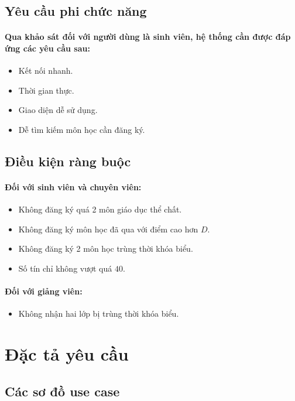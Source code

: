 \documentclass{article}
\begin{document}
  \subsection{Yêu cầu phi chức năng}
    \paragraph{
      \textnormal{
        Qua khảo sát đối với người dùng là sinh viên, hệ thống cần được đáp ứng các yêu cầu sau:
      }
    }
    \begin{itemize}
      \item Kết nối nhanh.
      \item Thời gian thực.
      \item Giao diện dễ sử dụng.
      \item Dễ tìm kiếm môn học cần đăng ký.
    \end{itemize}
  
  \subsection{Điều kiện ràng buộc}
    \paragraph{Đối với sinh viên và chuyên viên:}
    \begin{itemize}
      \item Không đăng ký quá 2 môn giáo dục thể chất.
      \item Không đăng ký môn học đã qua với điểm cao hơn $ D $.
      \item Không đăng ký 2 môn học trùng thời khóa biểu.
      \item Số tín chỉ không vượt quá $ 40 $.
    \end{itemize}

    \paragraph{Đối với giảng viên:}
    \begin{itemize}
      \item Không nhận hai lớp bị trùng thời khóa biểu.
    \end{itemize}

\section{Đặc tả yêu cầu}

  \subsection{Các sơ đồ use case}
\end{document}
